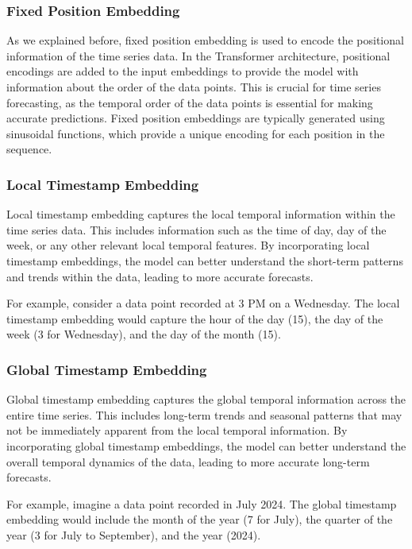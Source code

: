 \subsubsection{Fixed Position Embedding}
As we explained before, fixed position embedding is used to encode the positional information of the time series data. In the Transformer architecture, positional encodings are added to the input embeddings to provide the model with information about the order of the data points. This is crucial for time series forecasting, as the temporal order of the data points is essential for making accurate predictions. Fixed position embeddings are typically generated using sinusoidal functions, which provide a unique encoding for each position in the sequence.

\subsubsection{Local Timestamp Embedding}
Local timestamp embedding captures the local temporal information within the time series data. This includes information such as the time of day, day of the week, or any other relevant local temporal features. By incorporating local timestamp embeddings, the model can better understand the short-term patterns and trends within the data, leading to more accurate forecasts.

For example, consider a data point recorded at 3 PM on a Wednesday. The local timestamp embedding would capture the hour of the day (15), the day of the week (3 for Wednesday), and the day of the month (15).

\subsubsection{Global Timestamp Embedding}
Global timestamp embedding captures the global temporal information across the entire time series. This includes long-term trends and seasonal patterns that may not be immediately apparent from the local temporal information. By incorporating global timestamp embeddings, the model can better understand the overall temporal dynamics of the data, leading to more accurate long-term forecasts.

For example, imagine a data point recorded in July 2024. The global timestamp embedding would include the month of the year (7 for July), the quarter of the year (3 for July to September), and the year (2024).

